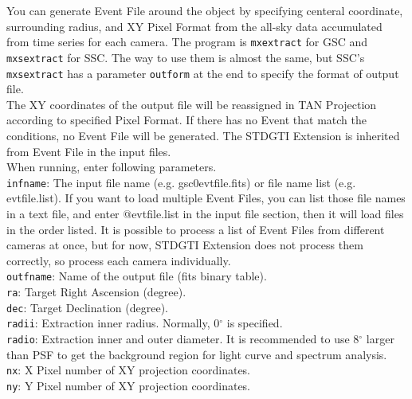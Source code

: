 \documentclass[10pt]{report}
\makeatletter
\renewcommand{\_}{\textscale{.5}{\textbf{\textunderscore}}}
\newcommand{\at}{\makeatletter @\makeatother}
\makeatother
\begin{document}
You can generate Event File around the object by specifying centeral coordinate, surrounding radius, and XY Pixel Format from the all-sky data accumulated from time series for each camera. The program is \texttt{mxextract} for GSC and \texttt{mxsextract} for SSC. The way to use them is almost the same, but SSC's \texttt{mxsextract} has a parameter \texttt{outform} at the end to specify the format of output file. \\
\indent The XY coordinates of the output file will be reassigned in TAN Projection according to specified Pixel Format. If there has no Event that match the conditions, no Event File will be generated. The STDGTI Extension is inherited from Event File in the input files.\\
\indent When running, enter following parameters. \\

\noindent \texttt{infname}: The input file name (e.g. gsc0\_evtfile.fits) or file name list (e.g. evtfile.list). If you want to load multiple Event Files, you can list those file names in a text file, and enter \at evtfile.list in the input file section, then it will load files in the order listed. It is possible to process a list of Event Files from different cameras at once, but for now, STDGTI Extension does not process them correctly, so process each camera individually. \\

\noindent \texttt{outfname}: Name of the output file (fits binary table). \\

\noindent \texttt{ra}: Target Right Ascension (degree). \\

\noindent \texttt{dec}: Target Declination (degree). \\

\noindent \texttt{radi\_i}: Extraction inner radius. Normally, 0$^{\circ}$ is specified.\\

\noindent \texttt{radi\_o}: Extraction inner and outer diameter. It is recommended to use 8$^{\circ}$ larger than PSF to get the background region for light curve and spectrum analysis. \\

\noindent \texttt{nx}: X Pixel number of XY projection coordinates.\\

\noindent \texttt{ny}: Y Pixel number of XY projection coordinates.\\
\end{document}
